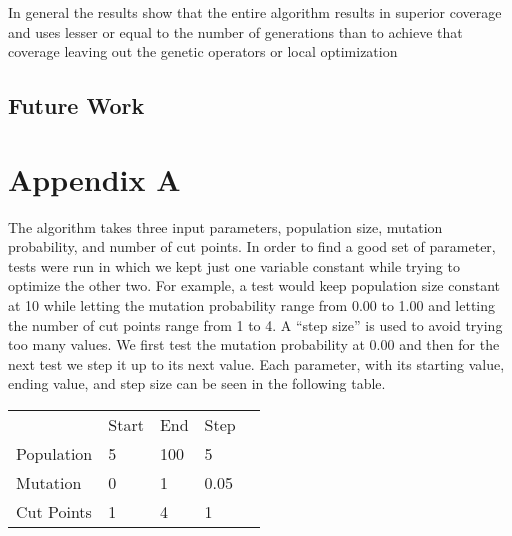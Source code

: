 \documentclass[runningheads]{llncs}
\begin{document}
In general the results show that the entire algorithm results in superior coverage and uses lesser or equal to the number of generations than to achieve that coverage leaving out the genetic operators or local optimization

\subsection{Future Work}

\newpage
\section*{Appendix A}

The algorithm takes three input parameters, population size, mutation probability, and number of cut points. In order to find a good set of parameter, tests were run in which we kept just one variable constant while trying to optimize the other two. For example, a test would keep population size constant at 10 while letting the mutation probability range from 0.00 to 1.00 and letting the number of cut points range from 1 to 4. A ``step size'' is used to avoid trying too many values. We first test the mutation probability at 0.00 and then for the next test we step it up to its next value. Each parameter, with its starting value, ending value, and step size can be seen in the following table.

\begin{table}[h]
\begin{tabular}{l|l|l|l|l}
	\cline{2-4}
	                                 & Start & End & Step &  \\ \cline{1-4}
	\multicolumn{1}{|l|}{Population} & 5     & 100 & 5    &  \\ \cline{1-4}
	\multicolumn{1}{|l|}{Mutation}   & 0     & 1   & 0.05 &  \\ \cline{1-4}
	\multicolumn{1}{|l|}{Cut Points} & 1     & 4   & 1    &  \\ \cline{1-4}
\end{tabular}
\end{table}
\end{document}
